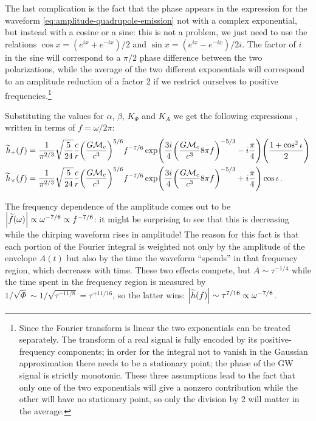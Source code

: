 \documentclass[main.tex]{subfiles}
\begin{document}
The last complication is the fact that the phase appears in the expression for the waveform \eqref{eq:amplitude-quadrupole-emission} not with a complex exponential, but instead with a cosine or a sine: this is not a problem, we just need to use the relations \(\cos x = (e^{ix}+e^{-ix}) / 2\) and \(\sin x = (e^{ix}- e^{-ix}) / 2i\). 
The factor of \(i\) in the sine will correspond to a \(\pi /2\) phase difference between the two polarizations, while the average of the two different exponentials will correspond to an amplitude reduction of a factor 2 if we restrict ourselves to positive frequencies.\footnote{Since the Fourier transform is linear the two exponentials can be treated separately. The transform of a real signal is fully encoded by its positive-frequency components; in order for the integral not to vanish in the Gaussian approximation there needs to be a stationary point; the phase of the \ac{GW} signal is strictly monotonic. These three assumptions lead to the fact that only one of the two exponentials will give a nonzero contribution while the other will have no stationary point, so only the division by 2 will matter in the average.}

Substituting the values for \(\alpha \), \(\beta \), \(K_\Phi \) and \(K_A\) we get the following expressions \cite[eqs.\ 4.34--37]{maggioreGravitationalWavesVolume2007}, written in terms of \(f = \omega / 2\pi \): 
%
\begin{subequations}
\begin{align} \label{eq:spa-waveforms}
\widetilde{h}_{+}(f) &= \frac{1}{\pi^{2/3}} \sqrt{ \frac{5}{24}} 
\frac{c}{r} \qty( \frac{G \mathcal{M}_c}{c^3})^{5/6} f^{-7/6} 
\exp(\frac{3i}{4} \qty(\frac{G \mathcal{M}_c}{c^3} 8 \pi f)^{-5/3} - i \frac{\pi}{4})
\qty( \frac{1 + \cos^2\iota }{2}) 
\\
\widetilde{h}_{ \times }(f) &= \frac{1}{\pi^{2/3}} \sqrt{ \frac{5}{24}} 
\frac{c}{r} \qty( \frac{G \mathcal{M}_c}{c^3})^{5/6} f^{-7/6} 
\exp(\frac{3i}{4} \qty(\frac{G \mathcal{M}_c}{c^3} 8 \pi f)^{-5/3} + i \frac{\pi}{4})
\cos \iota 
\,.
\end{align}
\end{subequations}

The frequency dependence of the amplitude comes out to be \(\abs{\widetilde{f}(\omega )} \propto \omega^{-7/6} \propto f^{-7/6}\):  it might be surprising to see that this is decreasing while the chirping waveform rises in amplitude! 
The reason for this fact is that each portion of the Fourier integral is weighted not only by the amplitude of the envelope \(A(t)\) but also by the time the waveform ``spends'' in that frequency region, which decreases with time. 
These two effects compete, but \(A \sim \tau^{-1/4}\) while the time spent in the frequency region is measured by \(1/ \sqrt{\ddot{\Phi}} \sim 1/ \sqrt{\tau^{-11/8}} = \tau^{+11/16}\), so the latter wins: \(\abs{\widetilde{h}(f)} \sim \tau^{7/16} \propto \omega^{-7/6}\). 
\end{document}
